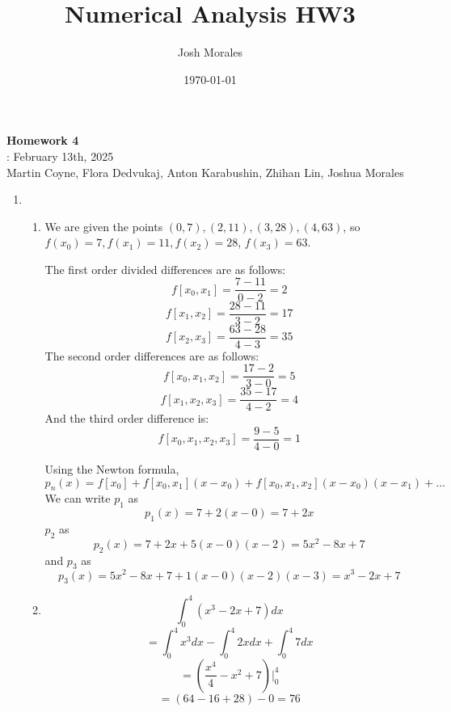 \documentclass[12pt]{article}
\title{Numerical Analysis HW3}
\author{Josh Morales}
\date{\today}
\begin{document}
\pagestyle{fancy}
\begin{center}
\textbf{\Large Homework 4} \\
: February 13th, 2025\\
Martin Coyne, Flora Dedvukaj, Anton Karabushin, Zhihan Lin, Joshua Morales
\end{center}
\begin{enumerate}[leftmargin=2em]
    \item
    \begin{enumerate}
        \item
        We are given the points $(0,7), (2,11), (3,28), (4, 63)$, so $f(x_0) = 7, f(x_1)=11, f(x_2)=28$, $f(x_3)=63$.
        
        The first order divided differences are as follows:
        \[f[x_0, x_1] = \frac{7-11}{0-2} = 2\]
        \[f[x_1, x_2] = \frac{28-11}{3-2} = 17\]
        \[f[x_2, x_3] = \frac{63-28}{4-3} = 35\]
        The second order differences are as follows:
        \[f[x_0, x_1, x_2] = \frac{17-2}{3-0} = 5\]
        \[f[x_1, x_2, x_3] = \frac{35-17}{4-2} = 4\]
        And the third order difference is:
        \[f[x_0, x_1, x_2, x_3] = \frac{9-5}{4-0} = 1\]

        Using the Newton formula,
        \[p_n(x)=f[x_0]+f[x_0,x_1](x-x_0) + f[x_0, x_1, x_2](x-x_0)(x-x_1)+...\]
        We can write $p_1$ as
        \[p_1(x) = 7+2(x-0) = 7+2x\]
        $p_2$ as
        \[p_2(x) = 7+2x+5(x-0)(x-2) = 5x^2-8x+7\]
        and $p_3$ as
        \[p_3(x) = 5x^2-8x+7+1(x-0)(x-2)(x-3) = x^3-2x+7\]

        \item 
        \[ \int_{0}^{4}(x^3-2x+7)dx \]
        \[ = \int_{0}^{4}x^3dx - \int_{0}^{4}2xdx + \int_{0}^{4}7dx\]
        \[ = (\frac{x^4}{4} - x^2 + 7)\vert_{0}^{4}\]
        \[ = (64 - 16 + 28) - 0 = 76\]
    \end{enumerate}


\end{enumerate}
\end{document}
